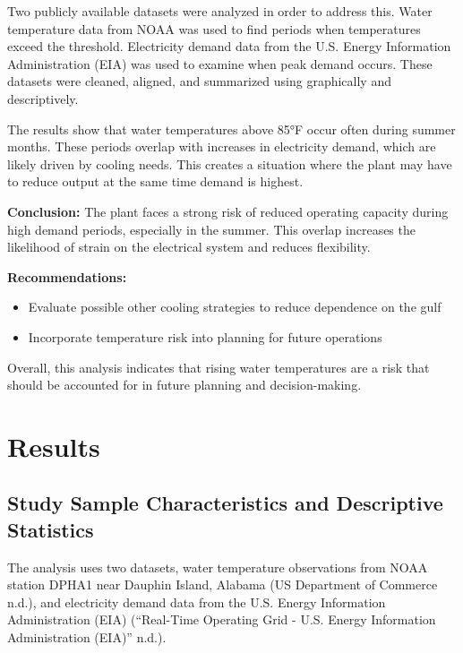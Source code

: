 \documentclass[
  letterpaper,
  DIV=11,
  numbers=noendperiod]{scrreprt}
\providecommand{\tightlist}{%
  \setlength{\itemsep}{0pt}\setlength{\parskip}{0pt}}
\begin{document}
Two publicly available datasets were analyzed in order to address this.
Water temperature data from NOAA was used to find periods when
temperatures exceed the threshold. Electricity demand data from the U.S.
Energy Information Administration (EIA) was used to examine when peak
demand occurs. These datasets were cleaned, aligned, and summarized
using graphically and descriptively.

The results show that water temperatures above 85°F occur often during
summer months. These periods overlap with increases in electricity
demand, which are likely driven by cooling needs. This creates a
situation where the plant may have to reduce output at the same time
demand is highest.

\textbf{Conclusion:} The plant faces a strong risk of reduced operating
capacity during high demand periods, especially in the summer. This
overlap increases the likelihood of strain on the electrical system and
reduces flexibility.

\textbf{Recommendations:}

\begin{itemize}
\tightlist
\item
  Evaluate possible other cooling strategies to reduce dependence on the
  gulf
\item
  Incorporate temperature risk into planning for future operations
\end{itemize}

Overall, this analysis indicates that rising water temperatures are a
risk that should be accounted for in future planning and
decision-making.


\chapter{Results}\label{results}

\section{Study Sample Characteristics and Descriptive
Statistics}\label{study-sample-characteristics-and-descriptive-statistics}

The analysis uses two datasets, water temperature observations from NOAA
station DPHA1 near Dauphin Island, Alabama (US Department of Commerce
n.d.), and electricity demand data from the U.S. Energy Information
Administration (EIA) ({``Real-Time {Operating Grid} - {U}.{S}. {Energy
Information Administration} ({EIA})''} n.d.).
\end{document}
